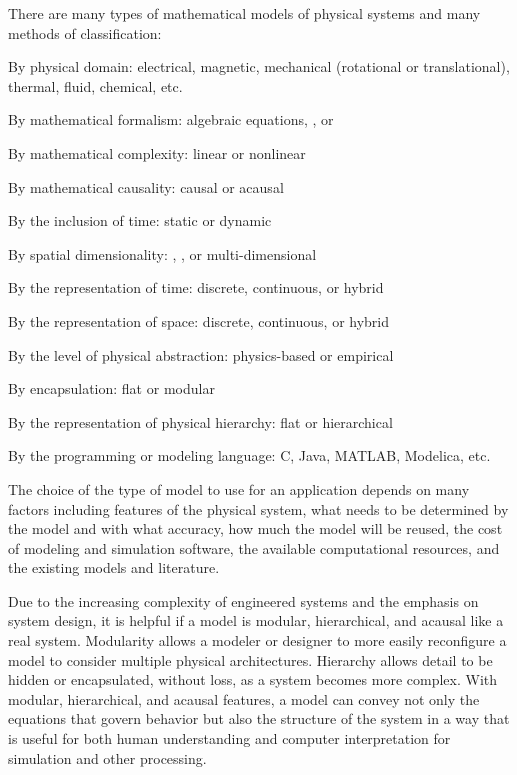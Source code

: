 There are many types of mathematical models of physical systems and many methods of classification:
\begin{itemize*}
  \item By physical domain: electrical, magnetic, mechanical (rotational or translational), thermal, fluid, chemical, etc.
  \item By mathematical formalism: algebraic equations, ,  or 
  \item By mathematical complexity: linear or nonlinear
  \item By mathematical causality: causal or acausal
  \item By the inclusion of time: static or dynamic
  \item By spatial dimensionality: , , or multi-dimensional
  \item By the representation of time: discrete, continuous, or hybrid
  \item By the representation of space: discrete, continuous, or hybrid
  \item By the level of physical abstraction: physics-based or empirical
  \item By encapsulation: flat or modular
  \item By the representation of physical hierarchy: flat or hierarchical
  \item By the programming or modeling language: C, Java, MATLAB, Modelica, etc.
\end{itemize*}
The choice of the type of model to use for an application depends on many factors including features of the physical system, what needs to be determined by the model and with what accuracy, how much the model will be reused, the cost of modeling and simulation software, the available computational resources, and the existing models and literature.

Due to the increasing complexity of engineered systems and the emphasis on system design, it is helpful if a model is modular, hierarchical, and acausal like a real system.  Modularity allows a modeler or designer to more easily reconfigure a model to consider multiple physical architectures.  Hierarchy allows detail to be hidden or encapsulated, without loss, as a system becomes more complex.  With modular, hierarchical, and acausal features, a model can convey not only the equations that govern behavior but also the structure of the system in a way that is useful for both human understanding and computer interpretation for simulation and other processing.

